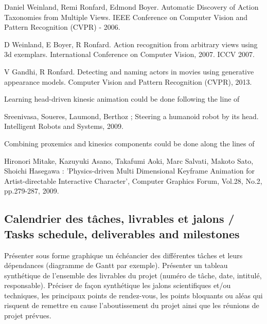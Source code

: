 Daniel Weinland, Remi Ronfard, Edmond Boyer. Automatic Discovery of Action Taxonomies from Multiple Views. IEEE Conference on Computer Vision and Pattern Recognition (CVPR) - 2006. 

D Weinland, E Boyer, R Ronfard. Action recognition from arbitrary views using 3d exemplars. International Conference on Computer Vision, 2007. ICCV 2007.

V Gandhi, R Ronfard.   Detecting and naming actors in movies using generative appearance models. Computer Vision and Pattern Recognition (CVPR), 2013.


Learning head-driven kinesic animation could be done following the line of 

Sreenivasa, Soueres, Laumond, Berthoz ; Steering a humanoid robot by its head. Intelligent Robots and Systems, 2009.

Combining proxemics and kinesics components could be done along the lines of

Hironori Mitake, Kazuyuki Asano, Takafumi Aoki, Marc Salvati, Makoto Sato, Shoichi Hasegawa : 'Physics-driven Multi Dimensional Keyframe Animation for Artist-directable Interactive Character', Computer Graphics Forum, Vol.28, No.2, pp.279-287, 2009.





\subsection{Calendrier des tâches, livrables et jalons / Tasks schedule, deliverables and milestones}
\begin{xcomment} 
Pr\'esenter sous forme graphique un \'ech\'eancier des diff\'erentes tâches et leurs d\'ependances (diagramme de Gantt par exemple).
Pr\'esenter un tableau synth\'etique de l'ensemble des livrables du projet (num\'ero de tâche, date, intitul\'e, responsable).
Pr\'eciser de façon synth\'etique les jalons scientifiques et/ou techniques, les principaux points de rendez-vous, les points bloquants ou al\'eas qui risquent de remettre en cause l'aboutissement du projet ainsi que les r\'eunions de projet pr\'evues.

\end{xcomment}

\endinput